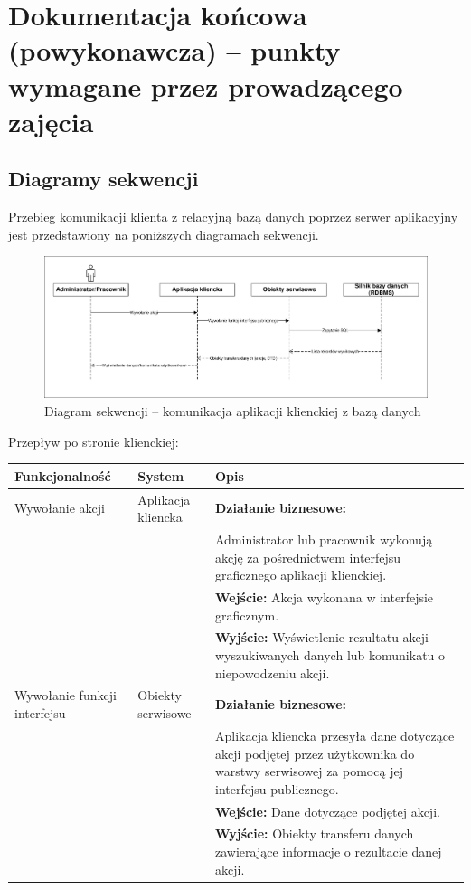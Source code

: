 \documentclass[10pt,a4paper]{article}
\begin{document}
\newpage
\section{Dokumentacja końcowa (powykonawcza) -- punkty wymagane przez prowadzącego zajęcia}

\subsection{Diagramy sekwencji}
Przebieg komunikacji klienta z relacyjną bazą danych poprzez serwer aplikacyjny jest przedstawiony na poniższych diagramach sekwencji.
\begin{figure}[H]
	\includegraphics[width=16cm]{sequence.pdf} %
	\caption{Diagram sekwencji -- komunikacja aplikacji klienckiej z bazą danych}
\end{figure}
Przepływ po stronie klienckiej:
\begin{table}[H]
	\begin{tabularx}{\textwidth}{|l|l|X|}
		\hline
		\textbf{Funkcjonalność} & \textbf{System} & \textbf{Opis} \\
		\hline
		Wywołanie akcji &
		Aplikacja kliencka &
		\textbf{Działanie biznesowe:} \\
		& & Administrator lub pracownik wykonują akcję za pośrednictwem interfejsu graficznego aplikacji klienckiej. \\
		& & \textbf{Wejście:} Akcja wykonana w interfejsie graficznym. \\
		& & \textbf{Wyjście:} Wyświetlenie rezultatu akcji -- wyszukiwanych danych lub komunikatu o niepowodzeniu akcji. \\
		\hline
		Wywołanie funkcji interfejsu &
		Obiekty serwisowe &
		\textbf{Działanie biznesowe:} \\
		& & Aplikacja kliencka przesyła dane dotyczące akcji podjętej przez użytkownika do warstwy serwisowej za pomocą jej interfejsu publicznego. \\
		& & \textbf{Wejście:} Dane dotyczące podjętej akcji. \\
		& & \textbf{Wyjście:} Obiekty transferu danych zawierające informacje o rezultacie danej akcji. \\
		\hline
	\end{tabularx}
\end{table}
\end{document}
